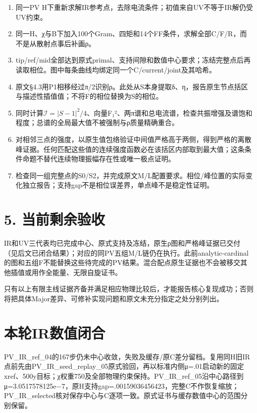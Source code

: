 \documentclass[
  10pt,
  a4paper,
]{article}
\providecommand{\tightlist}{%
  \setlength{\itemsep}{0pt}\setlength{\parskip}{0pt}}
\begin{document}
\begin{enumerate}
\def\labelenumi{\arabic{enumi}.}
\tightlist
\item
  同一PV
  H下重新求解IR参考点，去除电流条件；初值来自UV不等于IR解仍受UV约束。
\item
  同一H、χ与B下加入100个Gram、四矩和14个FF条件，求解全部C/F/R，而不是从散射点事后补画ρ。
\item
  tip/ref/mid全部达到原式primal、支持间隙和数值中心要求；冻结完整点后再读取相位。图中每条曲线均绑定同一个C/current/joint及其哈希。
\item
  原文§4.3用P1相移经过π/2识别ρ。此处从S本身提取δ、η，报告原生节点括区与描述性插值值；不将F的相位替换为S的相位。
\item
  同时计算\(\mathcal I=|S-1|^2/4\)、向量\textbar F₁\textbar²、两π谱和总电流谱，检查共振增强及谱饱和程度；总谱的全局最大值不被强制与ρ质量精确重合。
\item
  对相邻三点的强度，以原生值包络验证中间值严格高于两侧，得到严格的离散峰证据。任何匹配这些值的连续强度函数必在该括区内部取到最大值；这条条件命题不替代连续物理振幅存在性或唯一极点证明。
\item
  检查同一组完整点的S0/S2，并完成原文M/L配置要求。相位/峰位置的实际变化独立报告；支持gap不是相位误差界，单点峰不是稳定性证明。
\end{enumerate}

\section{5. 当前剩余验收}\label{ux5f53ux524dux5269ux4f59ux9a8cux6536}

IR和UV三代表均已完成中心、原式支持及冻结，原生ρ图和严格峰证据已交付（见后文已闭合结果）；对应的同PV五组M/L链仍在执行。此前analytic-cardinal的图和五组F不能替换这些待完成的PV结果。混合配点原生证据也不会被移交其他插值或用作全能量、无限自旋证书。

只有以上有限主线证据齐备并满足相应物理比较后，才能报告核心复现成功；否则将把具体Major差异、可修补实现问题和原文未充分指定之处分别列出。

\section{本轮IR数值闭合}\label{ux672cux8f6eirux6570ux503cux95edux5408}

PV\_IR\_ref\_04的167步仍未中心收敛，失败及缓存/原C差分留档。复用同H旧IR点前先由PV\_IR\_seed\_replay\_05原式验回，再以标准内侧μ=.01启动新的固定xref、500y目标；χ权重750及全部物理约束保持。PV\_IR\_ref\_05沿中心路径到μ=3.0517578125e−7，原H支持gap=.00159036456423，完整C不作恢复缩放；PV\_IR\_selected核对保存中心与C逐项一致。原式证书与缓存数值中心的范围分别保留。
\end{document}
